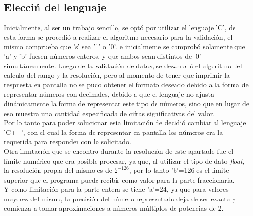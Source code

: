 \subsection{Elecci\'n del lenguaje}
\noindent
Inicialmente, al ser un trabajo sencillo, se opt\'o por utilizar el lenguaje 'C', de esta forma se procedi\'o a realizar el algoritmo necesario para la validaci\'on, el mismo comprueba que 's' sea '1' o '0', e inicialmente se comprob\'o solamente que 'a' y 'b' fuesen n\'umeros enteros, y que ambos sean distintos de '0' simultáneamente. Luego de la validaci\'on de datos, se desarroll\'o el algoritmo del calculo del rango y la resoluci\'on, pero al momento de tener que imprimir la respuesta en pantalla no se pudo obtener el formato deseado debido a la forma de representar n\'umeros con decimales, debido a que el lenguaje no ajusta din\'amicamente la forma de representar este tipo de números, sino que en lugar de eso muestra una cantidad especificada de cifras significativas del valor.\\
Por lo tanto para poder solucionar esta limitaci\'on de decidi\'o cambiar al lenguaje 'C++', con el cual la forma de representar en pantalla los n\'umeros era la requerida para responder con lo solicitado.\\
Otra limitaci\'on que se encontró durante la resolución de este apartado fue el l\'imite num\'erico que era posible procesar, ya que, al utilizar el tipo de dato \textit{float}, la resoluci\'on propia del mismo es de $2^{-126}$, por lo tanto 'b'=126 es el l\'imite superior que el programa puede recibir como valor para la parte fraccionaria.\\
Y como limitación para la parte entera se tiene 'a'=24, ya que para valores mayores del mismo, la precisión del n\'umero representado deja de ser exacta y comienza a tomar aproximaciones a n\'umeros múltiplos de potencias de 2.\\ 